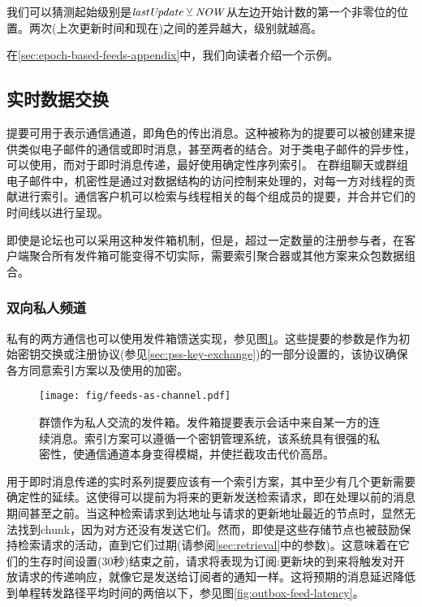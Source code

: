 我们可以猜测起始级别是$\mathit{lastUpdate}\veebar \mathit{NOW}$从左边开始计数的第一个非零位的位置。两次(上次更新时间和现在)之间的差异越大，级别就越高。

在\ref{sec:epoch-based-feeds-appendix}中，我们向读者介绍一个示例。

\subsection{实时数据交换}\label{sec:feed-as-channel}

提要可用于表示通信通道，即角色的传出消息。这种被称为的提要可以被创建来提供类似电子邮件的通信或即时消息，甚至两者的结合。对于类电子邮件的异步性，可以使用，而对于即时消息传递，最好使用确定性序列索引。
在群组聊天或群组电子邮件中，机密性是通过对数据结构的访问控制来处理的，对每一方对线程的贡献进行索引。通信客户机可以检索与线程相关的每个组成员的提要，并合并它们的时间线以进行呈现。

即使是论坛也可以采用这种发件箱机制，但是，超过一定数量的注册参与者，在客户端聚合所有发件箱可能变得不切实际，需要索引聚合器或其他方案来众包数据组合。

\subsubsection{双向私人频道}
 
私有的两方通信也可以使用发件箱馈送实现，参见图\ref{fig:feeds-as-channel}。这些提要的参数是作为初始密钥交换或注册协议(参见\ref{sec:pss-key-exchange})的一部分设置的，该协议确保各方同意索引方案以及使用的加密。 


\begin{figure}[htbp]
  \centering
  \texttt{[image: fig/feeds-as-channel.pdf]}  
  \caption[Swarm feed作为outboxes \statusgreen]{群馈作为私人交流的发件箱。发件箱提要表示会话中来自某一方的连续消息。索引方案可以遵循一个密钥管理系统，该系统具有很强的私密性，使通信通道本身变得模糊，并使拦截攻击代价高昂。}
\label{fig:feeds-as-channel}
\end{figure}


用于即时消息传递的实时系列提要应该有一个索引方案，其中至少有几个更新需要确定性的延续。这使得可以提前为将来的更新发送检索请求，即在处理以前的消息期间甚至之前。当这种检索请求到达地址与请求的更新地址最近的节点时，显然无法找到chunk，因为对方还没有发送它们。然而，即使是这些存储节点也被鼓励保持检索请求的活动，直到它们过期(请参阅\ref{sec:retrieval}中的参数)。这意味着在它们的生存时间设置(30秒)结束之前，请求将表现为订阅:更新块的到来将触发对开放请求的传递响应，就像它是发送给订阅者的通知一样。这将预期的消息延迟降低到单程转发路径平均时间的两倍以下，参见图\ref{fig:outbox-feed-latency}。 


